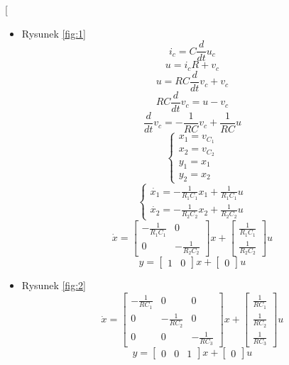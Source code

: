 \documentclass[12pt, letterpaper]{article}
\begin{document}
\begin{enumerate}
        \itemcl[\begin{itemize}
            \item Rysunek \ref{fig:1}
                \[i_c=C\frac{d}{dt}u_c\]
                \[u=i_cR+v_c\]
                \[u=RC\frac{d}{dt}v_c+v_c\]
                \[RC\frac{d}{dt}v_c=u-v_c\]
                \[\frac{d}{dt}v_c=-\frac{1}{RC}v_c+\frac{1}{RC}u\]
                \[\begin{cases}
                    x_1=v_{C_1}\\
                    x_2=v_{C_2}\\
                    y_1=x_1\\
                    y_2=x_2
                \end{cases}\]
                \[\begin{cases}
                    \dot{x_1}=-\frac{1}{R_1C_1}x_1+\frac{1}{R_1C_1}u\\
                    \dot{x_2}=-\frac{1}{R_2C_2}x_2+\frac{1}{R_2C_2}u
                \end{cases}\]
                \[\dot{x}=
                \begin{bmatrix}
                    -\frac{1}{R_1C_1}& 0\\
                    0& -\frac{1}{R_2C_2}
                \end{bmatrix}x+
                \begin{bmatrix}
                    \frac{1}{R_1C_1}\\
                    \frac{1}{R_2C_2}
                \end{bmatrix}u\]
                \[y=
                \begin{bmatrix}
                    1&0
                \end{bmatrix}x+
                \begin{bmatrix}
                    0
                \end{bmatrix}u\]

            \item Rysunek \ref{fig:2}
                \[\dot{x}=
                \begin{bmatrix}
                    -\frac{1}{RC_1}& 0& 0\\
                    0& -\frac{1}{RC_2}& 0\\
                    0& 0& -\frac{1}{RC_3}
                \end{bmatrix}x+
                \begin{bmatrix}
                    \frac{1}{RC_1}\\
                    \frac{1}{RC_2}\\
                    \frac{1}{RC_3}
                \end{bmatrix}u\]
                \[y=
                \begin{bmatrix}
                    0&0&1
                \end{bmatrix}x+
                \begin{bmatrix}
                    0
                \end{bmatrix}u\]


\end{itemize}
\end{enumerate}
\end{document}
